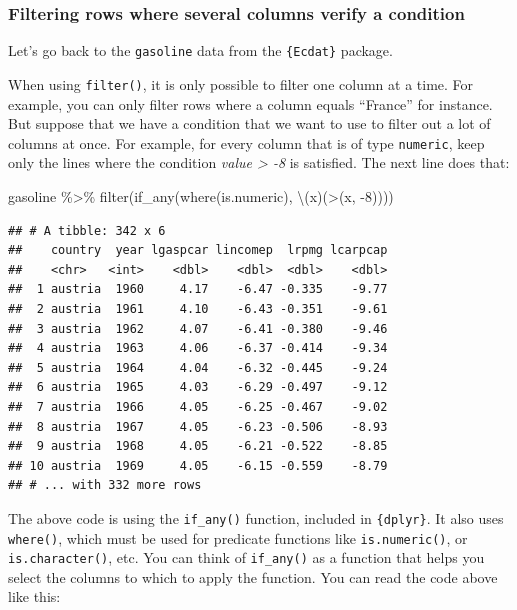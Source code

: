 \documentclass[
]{article}
\newenvironment{Shaded}{\begin{snugshade}}{\end{snugshade}}
\newcommand{\AttributeTok}[1]{\textcolor[rgb]{0.77,0.63,0.00}{#1}}
\newcommand{\DecValTok}[1]{\textcolor[rgb]{0.00,0.00,0.81}{#1}}
\newcommand{\FunctionTok}[1]{\textcolor[rgb]{0.00,0.00,0.00}{#1}}
\newcommand{\NormalTok}[1]{#1}
\newcommand{\SpecialCharTok}[1]{\textcolor[rgb]{0.00,0.00,0.00}{#1}}
\newcommand{\StringTok}[1]{\textcolor[rgb]{0.31,0.60,0.02}{#1}}
\begin{document}
\hypertarget{filtering-rows-where-several-columns-verify-a-condition}{%
\subsubsection{Filtering rows where several columns verify a condition}\label{filtering-rows-where-several-columns-verify-a-condition}}

Let's go back to the \texttt{gasoline} data from the \texttt{\{Ecdat\}} package.

When using \texttt{filter()}, it is only possible to filter one column at a time. For example, you can
only filter rows where a column equals ``France'' for instance. But suppose that we have a condition that we want
to use to filter out a lot of columns at once. For example, for every column that is of type
\texttt{numeric}, keep only the lines where the condition \emph{value \textgreater{} -8} is satisfied. The next line does
that:

\begin{Shaded}
\begin{Highlighting}[]
\NormalTok{gasoline }\SpecialCharTok{\%\textgreater{}\%}
  \FunctionTok{filter}\NormalTok{(}\FunctionTok{if\_any}\NormalTok{(}\FunctionTok{where}\NormalTok{(is.numeric), \textbackslash{}(x)(}\StringTok{\textasciigrave{}}\AttributeTok{\textgreater{}}\StringTok{\textasciigrave{}}\NormalTok{(x, }\SpecialCharTok{{-}}\DecValTok{8}\NormalTok{))))}
\end{Highlighting}
\end{Shaded}

\begin{verbatim}
## # A tibble: 342 x 6
##    country  year lgaspcar lincomep  lrpmg lcarpcap
##    <chr>   <int>    <dbl>    <dbl>  <dbl>    <dbl>
##  1 austria  1960     4.17    -6.47 -0.335    -9.77
##  2 austria  1961     4.10    -6.43 -0.351    -9.61
##  3 austria  1962     4.07    -6.41 -0.380    -9.46
##  4 austria  1963     4.06    -6.37 -0.414    -9.34
##  5 austria  1964     4.04    -6.32 -0.445    -9.24
##  6 austria  1965     4.03    -6.29 -0.497    -9.12
##  7 austria  1966     4.05    -6.25 -0.467    -9.02
##  8 austria  1967     4.05    -6.23 -0.506    -8.93
##  9 austria  1968     4.05    -6.21 -0.522    -8.85
## 10 austria  1969     4.05    -6.15 -0.559    -8.79
## # ... with 332 more rows
\end{verbatim}

The above code is using the \texttt{if\_any()} function, included in \texttt{\{dplyr\}}. It also uses
\texttt{where()}, which must be used for predicate functions like \texttt{is.numeric()}, or \texttt{is.character()}, etc.
You can think of \texttt{if\_any()} as a function that helps you select the columns to which to apply the
function. You can read the code above like this:
\end{document}
